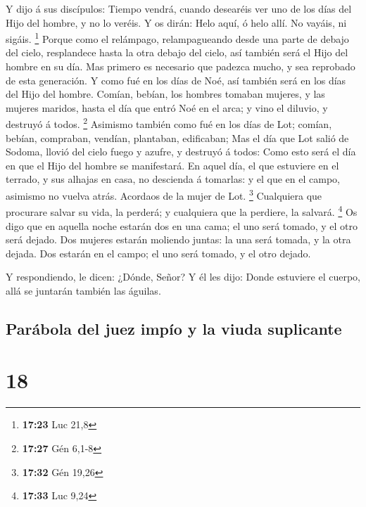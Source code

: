 Y dijo á sus discípulos: Tiempo vendrá, cuando desearéis
ver uno de los días del Hijo del hombre, y no lo veréis. 
Y os dirán: Helo aquí, ó helo allí. No vayáis, ni sigáis. \footnote{\textbf{17:23}
  Luc 21,8}  Porque como el relámpago, relampagueando
desde una parte de debajo del cielo, resplandece hasta la otra debajo
del cielo, así también será el Hijo del hombre en su día.
 Mas primero es necesario que padezca mucho, y sea
reprobado de esta generación.  Y como fué en los días de
Noé, así también será en los días del Hijo del hombre. 
Comían, bebían, los hombres tomaban mujeres, y las mujeres maridos,
hasta el día que entró Noé en el arca; y vino el diluvio, y destruyó á
todos. \footnote{\textbf{17:27} Gén 6,1-8}  Asimismo
también como fué en los días de Lot; comían, bebían, compraban, vendían,
plantaban, edificaban;  Mas el día que Lot salió de
Sodoma, llovió del cielo fuego y azufre, y destruyó á todos:
 Como esto será el día en que el Hijo del hombre se
manifestará.  En aquel día, el que estuviere en el
terrado, y sus alhajas en casa, no descienda á tomarlas: y el que en el
campo, asimismo no vuelva atrás.  Acordaos de la mujer de
Lot. \footnote{\textbf{17:32} Gén 19,26}  Cualquiera que
procurare salvar su vida, la perderá; y cualquiera que la perdiere, la
salvará. \footnote{\textbf{17:33} Luc 9,24}  Os digo que
en aquella noche estarán dos en una cama; el uno será tomado, y el otro
será dejado.  Dos mujeres estarán moliendo juntas: la una
será tomada, y la otra dejada.  Dos estarán en el campo;
el uno será tomado, y el otro dejado.

 Y respondiendo, le dicen: ¿Dónde, Señor? Y él les dijo:
Donde estuviere el cuerpo, allá se juntarán también las águilas.

\hypertarget{paruxe1bola-del-juez-impuxedo-y-la-viuda-suplicante}{%
\subsection{Parábola del juez impío y la viuda
suplicante}\label{paruxe1bola-del-juez-impuxedo-y-la-viuda-suplicante}}

\hypertarget{section-17}{%
\section{18}\label{section-17}}


